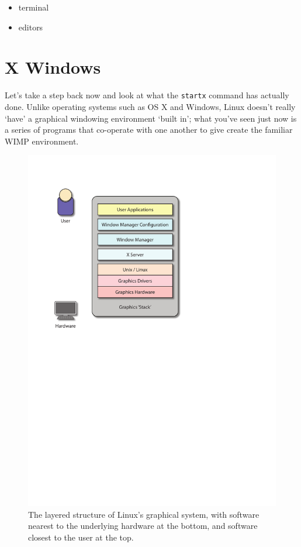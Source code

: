 \begin{itemize}
\item terminal
\item editors
\end{itemize}

\section{X Windows}

Let's take a step back now and look at what the \texttt{startx} command has actually done. Unlike operating systems such as OS X and Windows, Linux doesn't really `have' a graphical windowing environment `built in'; what you've seen just now is a series of programs that co-operate with one another to give create the familiar WIMP environment. 





\begin{figure}[htb]
  \begin{center}
    \includegraphics[width=12cm]{images/graphics-stack.pdf}
  \end{center}
\caption{The layered structure of Linux's graphical system, with software nearest to the underlying hardware at the bottom, and software closest to the user at the top.}
\label{figure:Xstructure}
\end{figure}


